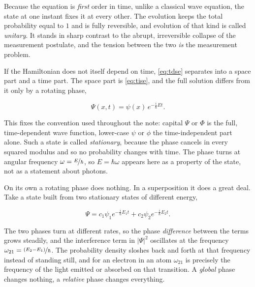         Because the equation is \emph{first} order in time, unlike a classical wave equation, the state at one instant fixes it at every other. The evolution keeps the total probability equal to $1$ and is fully reversible, and evolution of that kind is called \emph{unitary}. It stands in sharp contrast to the abrupt, irreversible collapse of the measurement postulate, and the tension between the two \emph{is} the measurement problem.

        If the Hamiltonian does not itself depend on time, \cref{eq:tdse} separates into a space part and a time part. The space part is \cref{eq:tise}, and the full solution differs from it only by a rotating phase,

        \begin{equation}\label{eq:stationary}
            \Psi(x,t) = \psi(x)\,e^{-\frac{i}{\hbar}Et} .
        \end{equation}

        This fixes the convention used throughout the note: capital $\Psi$ or $\Phi$ is the full, time-dependent wave function, lower-case $\psi$ or $\phi$ the time-independent part alone. Such a state is called \emph{stationary}, because the phase cancels in every squared modulus and so no probability changes with time. The phase turns at angular frequency $\omega = \nicefrac{E}{\hbar}$, so $E = \hbar\omega$ appears here as a property of the state, not as a statement about photons.

        On its own a rotating phase does nothing. In a superposition it does a great deal. Take a state built from two stationary states of different energy,

        \begin{equation*}
            \Psi = c_{1}\psi_{1}e^{-\frac{i}{\hbar}E_{1}t} + c_{2}\psi_{2}e^{-\frac{i}{\hbar}E_{2}t} .
        \end{equation*}

        The two phases turn at different rates, so the phase \emph{difference} between the terms grows steadily, and the interference term in $|\Psi|^{2}$ oscillates at the frequency $\omega_{21} = \nicefrac{\left(E_{2}-E_{1}\right)}{\hbar}$. The probability density sloshes back and forth at that frequency instead of standing still, and for an electron in an atom $\omega_{21}$ is precisely the frequency of the light emitted or absorbed on that transition. A \emph{global} phase changes nothing, a \emph{relative} phase changes everything.

